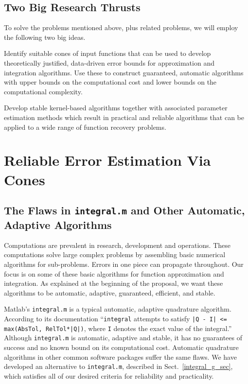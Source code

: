 \documentclass[11pt]{NSFamsart}
\newcommand{\Matlab}{{\sc Matlab}\xspace}
\begin{document}
\subsection*{Two Big Research Thrusts} To solve the problems mentioned above, plus related problems, we will employ the following two big ideas.
\begin{description}[leftmargin=2.5ex]

\item[Cones (Sect.\ \ref{SectCones})] Identify suitable cones of input functions that can be used to develop theoretically justified, data-driven error bounds for approximation and integration algorithms.  Use these to construct guaranteed, automatic algorithms with upper bounds on the computational cost and lower bounds on the computational complexity.

\item [Hilbert-Schmidt SVD (Sect.\ \ref{SectHSSVD})] Develop stable kernel-based algorithms together with associated parameter estimation methods which result in practical and reliable algorithms that can be applied to a wide range of function recovery problems.

\end{description}

\section{Reliable Error Estimation Via Cones}\label{SectCones}

\subsection{The Flaws in {\tt integral.m} and Other Automatic, Adaptive Algorithms} \label{drugssubsect} Computations are prevalent in research, development and operations.  These computations solve large complex problems by assembling basic numerical algorithms for sub-problems. Errors in one piece can propagate throughout.  Our focus is on some of these basic algorithms for function approximation and integration.  As explained at the beginning of the proposal, we want these algorithms to be automatic, adaptive, guaranteed, efficient, and stable.

\Matlab's {\tt integral.m} \citep{MAT8.2} is a typical automatic, adaptive quadrature algorithm.  According to its documentation ``{\tt integral} attempts to satisfy {\tt |Q - I| <= max(AbsTol, RelTol*|Q|)}, where {\tt I} denotes the exact value of the integral.'' Although {\tt integral.m} is automatic, adaptive and stable, it has no guarantees of success and no known bound on its computational cost. Automatic quadrature algorithms in other common software packages suffer the same flaws.  We have developed an alternative to {\tt integral.m}, described in Sect.\ \ref{integral_g_sec}, which satisfies all of our desired criteria for reliability and practicality.
\end{document}
